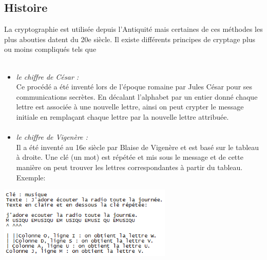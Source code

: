 \documentclass[a4paper,12pt,abstracton,titlepage]{scrartcl}
\begin{document}
\subsection{Histoire}
La cryptographie est utilisée depuis l'Antiquité mais certaines de ces méthodes les plus abouties datent du 20e siècle. Il existe différents principes de cryptage plus ou moins compliqués tels que\\
\\
\begin{minipage}[t]{0.5\textwidth}
    \begin{itemize}
    \item \textit{le chiffre de César :}\\
    Ce procédé a été inventé lors de l'époque romaine par Jules César pour ses communications secrètes. En décalant l'alphabet par un entier donné chaque lettre est associée à une nouvelle lettre, ainsi on peut crypter le message initiale en remplaçant chaque lettre par la nouvelle lettre attribuée.
    \paragraph{}
    \item \textit{le chiffre de Vigenère :}\\
    Il a été inventé au 16e siècle par Blaise de Vigenère et est basé sur le tableau à droite. Une clé (un mot) est répétée et mis sous le message et de cette manière on peut trouver les lettres correspondantes à partir du tableau.\\
    Exemple:
    \end{itemize}
    \begin{center}
    \raggedleft
 	\includegraphics[height=3.4cm]{./Pictures/exempleVigenere_neuf.png}
 	\label{exVig}
    \end{center} 
	
  \end{minipage} 
\end{document}
